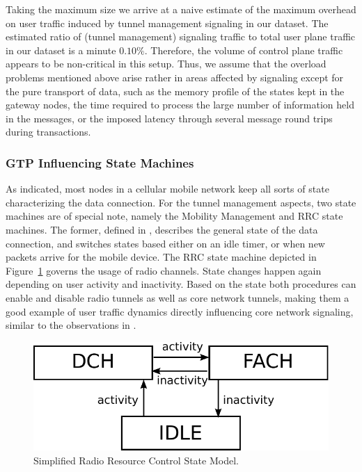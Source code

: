 Taking the maximum size we arrive at a naive estimate of the maximum overhead on user traffic induced by tunnel management signaling in our dataset. The estimated ratio of (tunnel management) signaling traffic to total user plane traffic in our dataset is a minute $0.10\%$. Therefore, the volume of control plane traffic appears to be non-critical in this setup. Thus, we assume that the overload problems mentioned above arise rather in areas affected by signaling except for the pure transport of data, such as the memory profile of the states kept in the gateway nodes, the time required to process the large number of information held in the messages, or the imposed latency through several message round trips during transactions.


\subsubsection{GTP Influencing State Machines}

As indicated, most nodes in a cellular mobile network keep all sorts of state characterizing the data connection. For the tunnel management aspects, two state machines are of special note, namely the Mobility Management and RRC state machines.
The former, defined in \cite{3gpp23060}, describes the general state of the data connection, and switches states based either on an idle timer, or when new packets arrive for the mobile device. The \ac{RRC} state machine depicted in Figure~\ref{fig:rrcstatemodel} governs the usage of radio channels. State changes happen again depending on user activity and inactivity.
Based on the state both procedures can enable and disable radio tunnels as well as core network tunnels, making them a good example of user traffic dynamics directly influencing core network signaling, similar to the observations in \cite{lee2007detection}.

\begin{figure}
	\centering
	\includegraphics[width=0.8\columnwidth]{images/IMC2013/rrc-simplified-state-model.pdf}
	\caption{Simplified Radio Resource Control State Model.}
	\label{fig:rrcstatemodel}
\end{figure}


